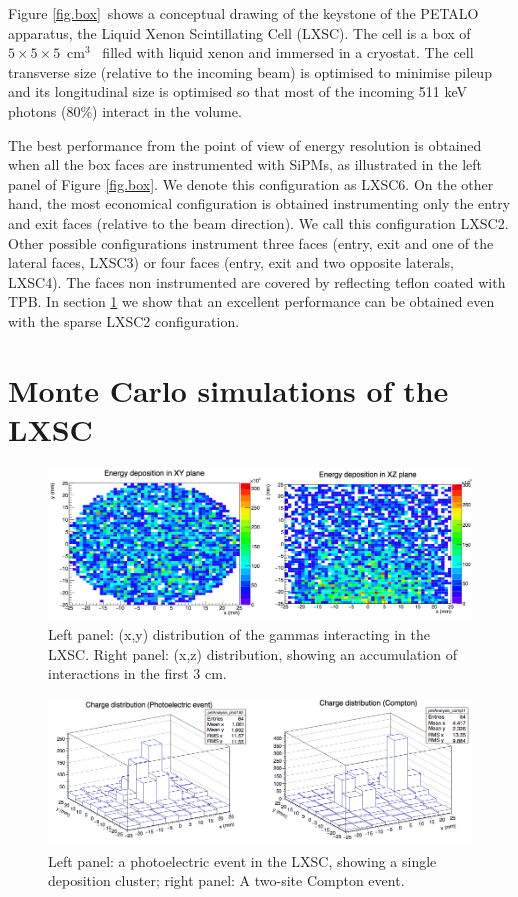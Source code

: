 \documentclass{JINST}
\begin{document}
Figure \ref{fig.box}~shows a conceptual drawing of the keystone of the PETALO apparatus, the Liquid Xenon Scintillating Cell (LXSC). The cell is a box of $5\times 5 \times 5$~cm$^3$~ filled with liquid xenon and immersed in a cryostat. The cell transverse size (relative to the incoming beam) is optimised to minimise pileup and its longitudinal size is optimised so that most of the incoming 511 keV photons (80\%) interact in the volume. 

The best performance from the point of view of energy resolution is obtained when all the box faces are instrumented with SiPMs, as illustrated in the left panel of Figure \ref{fig.box}. We denote this configuration as LXSC6. On the other hand, the most economical configuration is obtained instrumenting only the entry and exit faces (relative to the beam direction). We call this configuration LXSC2. Other possible configurations instrument three faces (entry, exit and one of the lateral faces, LXSC3) or four faces (entry, exit and two opposite laterals, LXSC4). 
The faces non instrumented are covered by reflecting teflon coated with TPB. In section \ref{sec.mc} we show that an excellent performance can be obtained even with the sparse LXSC2 configuration. 

\section{Monte Carlo simulations of the LXSC}
\label{sec.mc}

\begin{figure}[!htb]
	\centering
	\includegraphics[scale=0.5]{img/gammas.png}
	\caption{\label{fig.gammas}  Left panel: (x,y) distribution of the gammas interacting in the LXSC. Right panel: (x,z) distribution, showing an accumulation of interactions in the first 3 cm.  }
\end{figure}

\begin{figure}[!htb]
	\centering
	\includegraphics[scale=0.5]{img/Events.png}
	\caption{\label{fig.events}  Left panel: a photoelectric event in the LXSC, showing a single deposition cluster; right panel: A two-site Compton event.  }
\end{figure}
\end{document}
